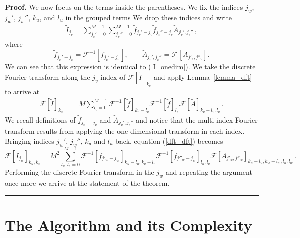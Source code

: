 \documentclass[12pt]{CSUNthesis}
\newenvironment{proof}[1][Proof]{\noindent\textbf{#1.} }{\newline \hspace*{\textwidth}\hspace*{-0,4cm} \rule{0.5em}{0.5em} \vspace{0,2cm}}
\def\calF{\mathcal{F}}
\begin{document}
\begin{proof}
We now focus on the terms inside the parentheses. We fix the indices $j_w$, $j_w'$, $j_w''$, $k_{u}$, and $l_{u}$ in the grouped terms We drop these indices and write
\begin{align*}
\tilde{I}_{j_v} =  \sum_{j_v'=0}^{M-1} \sum_{j_v''=0}^{M-1} \tilde{f}_{j_v'-j_v} \tilde{f}_{j_v''-j_v} \tilde{A}_{j_v',j_v''}\, , 
\end{align*}
where 
\begin{equation*}
\tilde{f}_{j_v'-j_v} = \calF^{-1}[f_{j_v'-j_v}],\qquad 
\tilde{A}_{j_v',j_v''} =  \calF[A_{j'_{v},j''_{v}}].
\end{equation*}
We can see that this expression is identical to (\ref{I_onedim}). We take the discrete Fourier transform along the $j_v$ index of $\calF[\tilde{I}]_{k_v}$ and apply Lemma~\ref{lemma_dft} to arrive at
\begin{align}
\label{dft_dft}
\calF[\tilde{I}]_{k_v} &= M \sum_{l_{v}=0}^{M-1} \calF^{-1}[ \tilde{f}]_{k_{v}-l_{v}} \calF^{-1}[\tilde{f}]_{l_{v}} \calF[\tilde{A}]_{k_{v}-l_{v},l_{v}}\, .
\end{align}
We recall definitions of $\tilde{f}_{j_v'-j_v}$ and $\tilde{A}_{j_v',j_v''}$ and notice that the 
multi-index  Fourier transform results from applying the one-dimensional transform in each index. 
Bringing indices
$j_w'$, $j_w''$, $k_{u}$ and $l_{u}$ back, equation (\ref{dft_dft}) becomes
\begin{equation*}
\calF[I_{j_w}]_{k_u,k_v} = M^2 \sum_{l_u,l_v=0}^{M-1} \calF^{-1}[f_{j'_w-j_w}]_{k_u-l_u,k_v-l_v} \calF^{-1}[f_{j''_w-j_w}]_{l_u,l_v} \calF[A_{j'_w,j''_w}]_{k_u-l_u,k_w-l_w,l_u,l_w}\, .
\end{equation*}
Performing the discrete Fourier transform in the $j_w$ and repeating the argument once more we arrive at the statement of the theorem.
\end{proof}


\section{The Algorithm and its Complexity}
\label{sec:algorithm}
\end{document}
